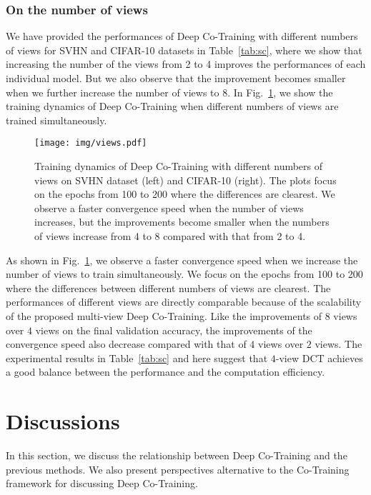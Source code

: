\documentclass[runningheads]{llncs}
\begin{document}
\subsubsection{On the number of views}
We have provided the performances of Deep Co-Training with different numbers of views for SVHN and CIFAR-10 datasets in Table~\ref{tab:sc}, where we show that increasing the number of the views from 2 to 4 improves the performances of each individual model.
But we also observe that the improvement becomes smaller when we further increase the number of views to 8.
In Fig.~\ref{fig:view}, we show the training dynamics of Deep Co-Training when different numbers of views are trained simultaneously.
\begin{figure}[t]
  \texttt{[image: img/views.pdf]}
  \caption{Training dynamics of Deep Co-Training with different numbers of views on SVHN dataset (left) and CIFAR-10 (right).
  The plots focus on the epochs from 100 to 200 where the differences are clearest.
  We observe a faster convergence speed when the number of views increases, but the improvements become smaller when the numbers of views increase from 4 to 8 compared with that from 2 to 4.
  }
  \label{fig:view}
\end{figure}

As shown in Fig.~\ref{fig:view}, we observe a faster convergence speed when we increase the number of views to train simultaneously.
We focus on the epochs from 100 to 200 where the differences between different numbers of views are clearest.
The performances of different views are directly comparable because of the scalability of the proposed multi-view Deep Co-Training.
Like the improvements of $8$ views over $4$ views on the final validation accuracy, the improvements of the convergence speed also decrease compared with that of $4$ views over $2$ views.
The experimental results in Table~\ref{tab:sc} and here suggest that $4$-view DCT achieves a good balance between the performance and the computation efficiency.

\section{Discussions}
In this section, we discuss the relationship between Deep Co-Training and the previous methods.
We also present perspectives alternative to the Co-Training framework for discussing Deep Co-Training.
\end{document}
